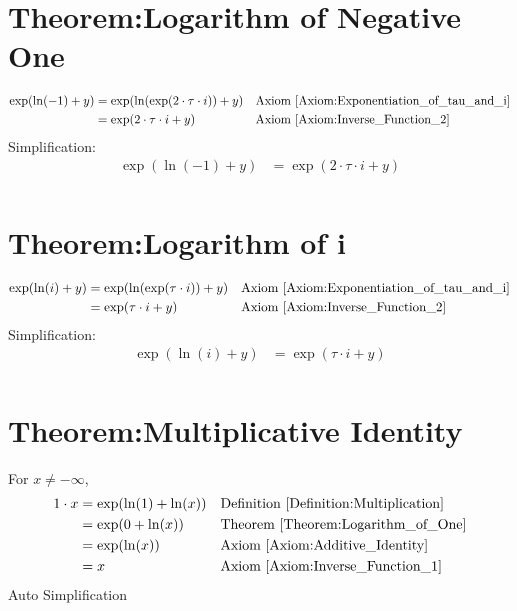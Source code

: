 \documentclass[12pt,a4paper]{report}
\begin{document}
\section{Theorem:Logarithm of Negative One}
\label{Theorem:Logarithm_of_Negative_One}
\begin{align*}
\exp(\ln(-1) + y)
&= \exp(\ln(\exp(2 \cdot \tau \cdot i)) + y)
&& \text{Axiom \ref{Axiom:Exponentiation_of_tau_and_i}} \\
&= \exp(2 \cdot \tau \cdot i + y)
&& \text{Axiom \ref{Axiom:Inverse_Function_2}} \\
\end{align*}
Simplification:
\begin{align*}
\exp(\ln(-1) + y) &= \exp(2 \cdot \tau \cdot i + y) \\
\end{align*}

\section{Theorem:Logarithm of i}
\label{Theorem:Logarithm_of_i}
\begin{align*}
\exp(\ln(i) + y)
&= \exp(\ln(\exp(\tau \cdot i)) + y)
&& \text{Axiom \ref{Axiom:Exponentiation_of_tau_and_i}} \\
&= \exp(\tau \cdot i + y)
&& \text{Axiom \ref{Axiom:Inverse_Function_2}} \\
\end{align*}
Simplification:
\begin{align*}
\exp(\ln(i) + y) &= \exp(\tau \cdot i + y) \\
\end{align*}

\section{Theorem:Multiplicative Identity}
\label{Theorem:Multiplicative_Identity}
For $x \neq -\infty$,
\begin{align*}
1 \cdot x
&= \exp(\ln(1) + \ln(x))
&& \text{Definition \ref{Definition:Multiplication}} \\
&= \exp(0 + \ln(x))
&& \text{Theorem \ref{Theorem:Logarithm_of_One}} \\
&= \exp(\ln(x))
&& \text{Axiom \ref{Axiom:Additive_Identity}} \\
&= x
&& \text{Axiom \ref{Axiom:Inverse_Function_1}} \\
\end{align*}
Auto Simplification
\end{document}
